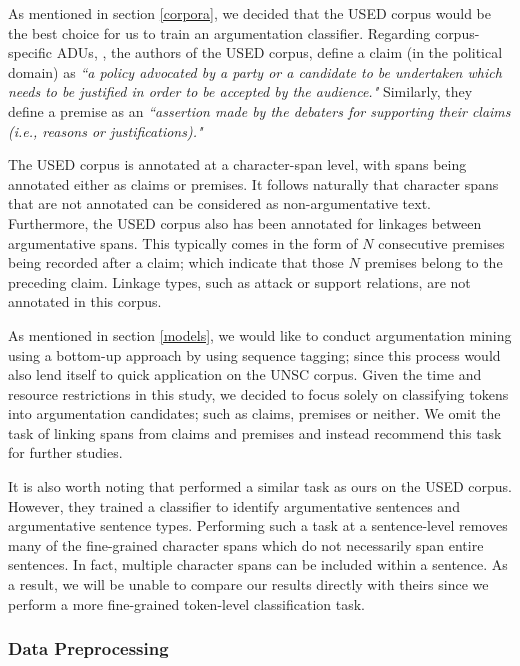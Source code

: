 As mentioned in section \ref{corpora}, we decided that the USED corpus would be the best choice for us to train an argumentation classifier. Regarding corpus-specific ADUs, \citet{haddadan-etal-2019-yes}, the authors of the USED corpus, define a claim (in the political domain) as \textit{``a policy advocated by a party or a candidate to be undertaken which needs to be justified in order to be accepted by the audience."} Similarly, they define a premise as an \textit{``assertion made by the debaters for supporting their claims (i.e., reasons or justifications)."}

The USED corpus is annotated at a character-span level, with spans being annotated either as claims or premises. It follows naturally that character spans that are not annotated can be considered as non-argumentative text. Furthermore, the USED corpus also has been annotated for linkages between argumentative spans. This typically comes in the form of $N$ consecutive premises being recorded after a claim; which indicate that those $N$ premises belong to the preceding claim. Linkage types, such as attack or support relations, are not annotated in this corpus.

As mentioned in section \ref{models}, we would like to conduct argumentation mining using a bottom-up approach by using sequence tagging; since this process would also lend itself to quick application on the UNSC corpus. Given the time and resource restrictions in this study, we decided to focus solely on classifying tokens into argumentation candidates; such as claims, premises or neither. We omit the task of linking spans from claims and premises and instead recommend this task for further studies.

It is also worth noting that \citet{haddadan-etal-2019-yes} performed a similar task as ours on the USED corpus. However, they trained a classifier to identify argumentative sentences and argumentative sentence types. Performing such a task at a sentence-level removes many of the fine-grained character spans which do not necessarily span entire sentences. In fact, multiple character spans can be included within a sentence. As a result, we will be unable to compare our results directly with theirs since we perform a more fine-grained token-level classification task.

\subsubsection{Data Preprocessing}


